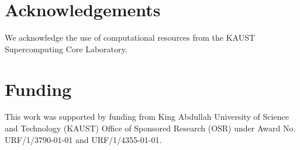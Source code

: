 \documentclass{bioinfo}
\begin{document}
\section*{Acknowledgements}
We acknowledge the use of computational resources from the 
KAUST Supercomputing Core Laboratory.

\section*{Funding}

This work was supported by funding from King Abdullah University of
Science and Technology (KAUST) Office of Sponsored Research (OSR)
under Award No. URF/1/3790-01-01 and URF/1/4355-01-01.

%
%
%
%
%
%
%
%

\end{document}
